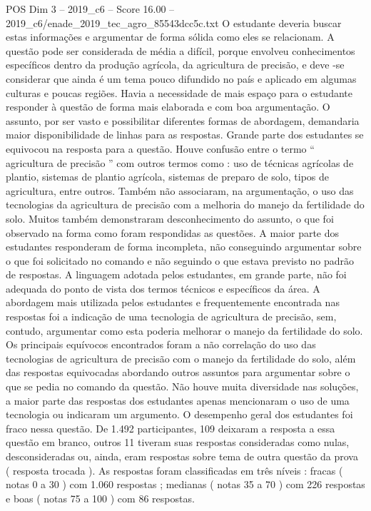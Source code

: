 \begin{textsample}{POS Dim 3 – 2019\_c6 – Score 16.00 – 2019\_c6/enade\_2019\_tec\_agro\_85543dcc5c.txt}
O estudante deveria buscar estas informações e argumentar de forma sólida como eles se relacionam.
A questão pode ser considerada de média a difícil, porque envolveu conhecimentos específicos dentro da produção agrícola, da agricultura de precisão, e deve -se considerar que ainda é um tema pouco difundido no país e aplicado em algumas culturas e poucas regiões.
Havia a necessidade de mais espaço para o estudante responder à questão de forma mais elaborada e com boa argumentação.
O assunto, por ser vasto e possibilitar diferentes formas de abordagem, demandaria maior disponibilidade de linhas para as respostas.
Grande parte dos estudantes se equivocou na resposta para a questão.
Houve confusão entre o termo “ agricultura de precisão ” com outros termos como : uso de técnicas agrícolas de plantio, sistemas de plantio agrícola, sistemas de preparo de solo, tipos de agricultura, entre outros.
Também não associaram, na argumentação, o uso das tecnologias da agricultura de precisão com a melhoria do manejo da fertilidade do solo.
Muitos também demonstraram desconhecimento do assunto, o que foi observado na forma como foram respondidas as questões.
A maior parte dos estudantes responderam de forma incompleta, não conseguindo argumentar sobre o que foi solicitado no comando e não seguindo o que estava previsto no padrão de respostas.
A linguagem adotada pelos estudantes, em grande parte, não foi adequada do ponto de vista dos termos técnicos e específicos da área.
A abordagem mais utilizada pelos estudantes e frequentemente encontrada nas respostas foi a indicação de uma tecnologia de agricultura de precisão, sem, contudo, argumentar como esta poderia melhorar o manejo da fertilidade do solo.
Os principais equívocos encontrados foram a não correlação do uso das tecnologias de agricultura de precisão com o manejo da fertilidade do solo, além das respostas equivocadas abordando outros assuntos para argumentar sobre o que se pedia no comando da questão.
Não houve muita diversidade nas soluções, a maior parte das respostas dos estudantes apenas mencionaram o uso de uma tecnologia ou indicaram um argumento.
O desempenho geral dos estudantes foi fraco nessa questão.
De 1.492 participantes, 109 deixaram a resposta a essa questão em branco, outros 11 tiveram suas respostas consideradas como nulas, desconsideradas ou, ainda, eram respostas sobre tema de outra questão da prova ( resposta trocada ).
As respostas foram classificadas em três níveis : fracas ( notas 0 a 30 ) com 1.060 respostas ; medianas ( notas 35 a 70 ) com 226 respostas e boas ( notas 75 a 100 ) com 86 respostas.

\end{textsample}
